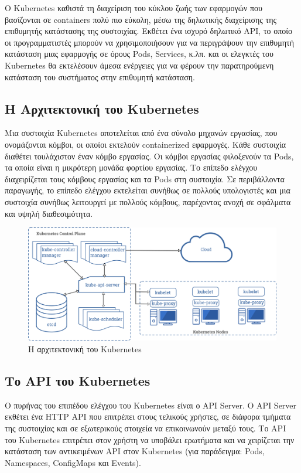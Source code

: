 Ο Kubernetes καθιστά τη διαχείριση του κύκλου ζωής των εφαρμογών που βασίζονται
σε containers πολύ πιο εύκολη, μέσω της δηλωτικής διαχείρισης της επιθυμητής
κατάστασης της συστοιχίας. Εκθέτει ένα ισχυρό δηλωτικό API, το οποίο οι
προγραμματιστές μπορούν να χρησιμοποιήσουν για να περιγράψουν την επιθυμητή
κατάσταση μιας εφαρμογής σε όρους Pods, Services, κ.λπ. και οι ελεγκτές του
Kubernetes θα εκτελέσουν άμεσα ενέργειες για να φέρουν την παρατηρούμενη
κατάσταση του συστήματος στην επιθυμητή κατάσταση.

\subsection{Η Αρχιτεκτονική του Kubernetes}

Μια συστοιχία Kubernetes αποτελείται από ένα σύνολο μηχανών εργασίας, που
ονομάζονται κόμβοι, οι οποίοι εκτελούν containerized εφαρμογές. Κάθε συστοιχία
διαθέτει τουλάχιστον έναν κόμβο εργασίας. Οι κόμβοι εργασίας φιλοξενούν τα Pods,
τα οποία είναι η μικρότερη μονάδα φορτίου εργασίας. Το επίπεδο ελέγχου
διαχειρίζεται τους κόμβους εργασίας και τα Pods στη συστοιχία. Σε περιβάλλοντα
παραγωγής, το επίπεδο ελέγχου εκτελείται συνήθως σε πολλούς υπολογιστές και μια
συστοιχία συνήθως λειτουργεί με πολλούς κόμβους, παρέχοντας ανοχή σε σφάλματα
και υψηλή διαθεσιμότητα.

\begin{figure}
      \centering
      \includegraphics[width=\textwidth]{resources/components-of-kubernetes.png}
      \caption{H αρχιτεκτονική του Kubernetes}
\end{figure}

\subsection{Το API του Kubernetes}

Ο πυρήνας του επιπέδου ελέγχου του Kubernetes είναι ο  API Server. Ο  API Server
εκθέτει ένα HTTP API που επιτρέπει στους τελικούς χρήστες, σε διάφορα τμήματα
της συστοιχίας και σε εξωτερικούς στοιχεία να επικοινωνούν μεταξύ τους. Το API
του Kubernetes επιτρέπει στον χρήστη να υποβάλει ερωτήματα και να χειρίζεται
την κατάσταση των αντικειμένων API στον Kubernetes (για παράδειγμα: Pods,
Namespaces, ConfigMaps και Events).

